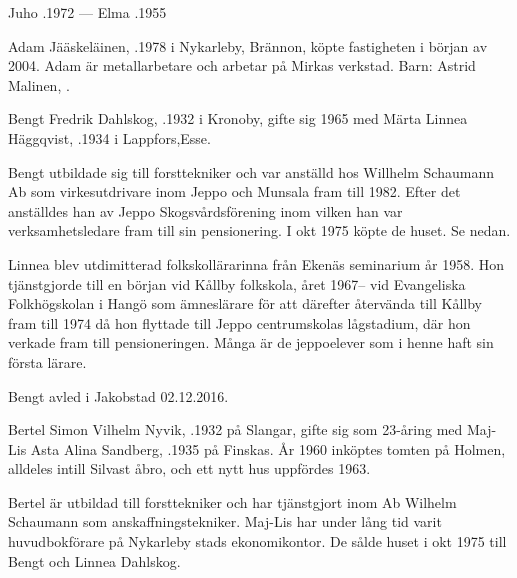 Juho .1972  ---  Elma .1955





Adam Jääskeläinen, .1978 i Nykarleby, Brännon, köpte fastigheten i början av 2004. Adam är metallarbetare och arbetar på Mirkas verkstad.
Barn: Astrid Malinen, .



Bengt Fredrik Dahlskog, .1932 i Kronoby, gifte sig 1965 med Märta Linnea Häggqvist, .1934 i Lappfors,Esse.

Bengt utbildade sig till forsttekniker och var anställd hos Willhelm Schaumann Ab som virkesutdrivare inom Jeppo och Munsala fram till 1982. Efter det anställdes han av Jeppo Skogsvårdsförening inom vilken han var verksamhetsledare fram till sin pensionering. I okt 1975 köpte de huset. Se nedan.

Linnea blev utdimitterad folkskollärarinna från Ekenäs seminarium år 1958. Hon tjänstgjorde till en början vid Kållby folkskola, året 1967-- vid Evangeliska Folkhögskolan i Hangö som ämneslärare för att därefter återvända till Kållby fram till 1974 då hon flyttade till Jeppo centrumskolas lågstadium, där hon verkade fram till pensioneringen. Många är de jeppoelever som i henne haft sin första lärare.
\begin{jhchildren}
  \item {}
  \item {}
  \item {}
\end{jhchildren}

Bengt avled i Jakobstad 02.12.2016.


Bertel Simon Vilhelm Nyvik, .1932 på Slangar, gifte sig som 23-åring med Maj-Lis Asta Alina Sandberg, .1935 på Finskas. År 1960 inköptes tomten på Holmen, alldeles intill Silvast åbro, och ett nytt hus uppfördes 1963.

Bertel är utbildad till forsttekniker och har tjänstgjort inom Ab Wilhelm Schaumann som anskaffningstekniker. Maj-Lis har under lång tid varit huvudbokförare på Nykarleby stads ekonomikontor. De sålde huset i okt 1975 till Bengt och Linnea Dahlskog.




